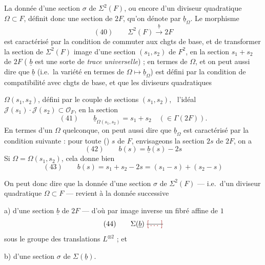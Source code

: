 \documentclass[11pt,a4paper]{article}
\begin{document}
 La donnée d'une section $\sigma$ de $\Sigma^2(F)$, ou encore d'un diviseur quadratique $\Omega \subset F$, \struck{\ill{}} définit donc une section de $2F$, qu'on  dénote par $\underline{b}_\Omega$. \struck{\ill{}} Le morphisme
\[
(40)\qquad \Sigma^2(F) \xrightarrow{\;\underline{b}\;} 2F
\]
est caractérisé par la condition de commuter aux chgts de base, et de transformer la section de $\Sigma^2(F)$ image d'une section $(s_1, s_2)$ de $F^2$, en la section $s_1 + s_2$ de $2F$ ( $\underline{b}$ est une sorte de \emph{trace universelle}) ;
en termes de $\Omega$, et on peut aussi dire que $\underline{b}$ (i.e.\ la variété en termes de $\Omega \mapsto \underline{b}_\Omega$) est défini par la condition de compatibilité avec chgts de base, et que  les diviseurs quadratiques

$\Omega(s_1, s_2)$, défini par le couple de sections $(s_1, s_2)$, \ l'idéal $\mathcal{J}(s_1)\cdot\mathcal{J}(s_2) \subset \mathcal{O}_F$, en la section
\[
(41)\qquad \underline{b}_{\Omega(s_1, s_2)} = s_1 + s_2 \quad (\in \Gamma(2F)) .
\]
En termes d'un $\Omega$ quelconque, on peut aussi dire que $\underline{b}_\Omega$ est caractérisé par la condition suivante : pour toute  \struck{\ill{}} () $s$ de $F$, envisageons la section $2s$ de $2F$, on a
\[
(42)\qquad b(s) = \underline{b}(s) - 2s
\]
Si $\Omega = \Omega(s_1, s_2)$, cela donne bien
\[
(43)\qquad b(s) = s_1 + s_2 - 2s = (s_1 - s) + (s_2 - s)
\]

On peut donc dire que la donnée d'une section $\sigma$ de $\Sigma^2(F)$ --- i.e.\ d'un diviseur quadratique $\Omega \subset F$ --- revient à la donnée successive

a) d'une section $\underline{b}$ de $2F$ --- d'où par \struck{\ill{}} image inverse un fibré affine de  $1$
\[
(44)\qquad \Sigma(\underline{b}) \ \text{\struck{\ill{}}}
\]
sous le groupe des translations $L^{\otimes 2}$ ; et

b) d'une section $\sigma$ de $\Sigma(\underline{b})$.
\end{document}
